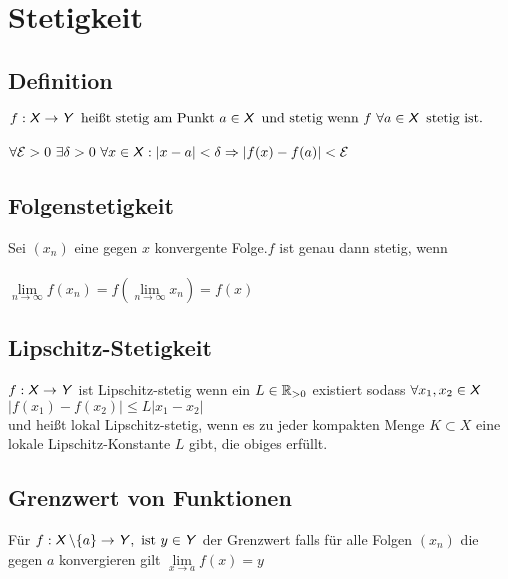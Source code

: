 \documentclass[german]{latex4ei/latex4ei_sheet}
\begin{document}
\section{Stetigkeit}

\begin{sectionbox}
	\subsection{Definition}
	$f:\operatorname{\textsf{\textit{X}}} \rightarrow \operatorname{\textsf{\textit{Y}}} \text{ heißt stetig am Punkt } a\in \operatorname{\textsf{\textit{X}}} \text{ und stetig wenn }f \text{  } \forall a \in \operatorname{\textsf{\textit{X}}} \text{ stetig ist.}$\\ \\
	$\forall \mathcal{E}>0 \text{  } \exists \delta >0 \text{  } \forall x \in \operatorname{\textsf{\textit{X}}} : |x-a|<\delta \Rightarrow |f(x)-f(a)|< \mathcal{E}$


\end{sectionbox}

\begin{sectionbox}
	\subsection{Folgenstetigkeit}
	Sei $(x_n)$ eine gegen $x$ konvergente Folge.$f$ ist genau dann stetig, wenn\\ \\
	$\lim \limits_{n \to \infty}f(x_n) = f(\lim \limits_{n \to \infty} x_n) = f(x)$

\end{sectionbox}


\begin{sectionbox}
	\subsection{Lipschitz-Stetigkeit}
	$f:\operatorname{\textsf{\textit{X}}} \rightarrow \operatorname{\textsf{\textit{Y}}}$ ist Lipschitz-stetig wenn ein $L \in \operatorname{\mathbb R}_{>0}$ existiert sodass $\forall x_1,x_2 \in \operatorname{\textsf{\textit{X}}}$\\
	$|f(x_1)-f(x_2)| \le L |x_1-x_2|$\\
	und heißt lokal Lipschitz-stetig, wenn es zu jeder kompakten Menge $K \subset X$ eine lokale Lipschitz-Konstante $L$ gibt, die obiges erfüllt.

\end{sectionbox}

\begin{sectionbox}
	\subsection{Grenzwert von Funktionen}
	Für $f:\operatorname{\textsf{\textit{X}}} \backslash \{a\} \rightarrow \operatorname{\textsf{\textit{Y}}}, \text{ ist } y \in \operatorname{\textsf{\textit{Y}}} $ der Grenzwert falls für alle Folgen $(x_n)$ die gegen $a$ konvergieren gilt $\lim \limits_{x \to a}f(x)=y$

\end{sectionbox}
\end{document}
